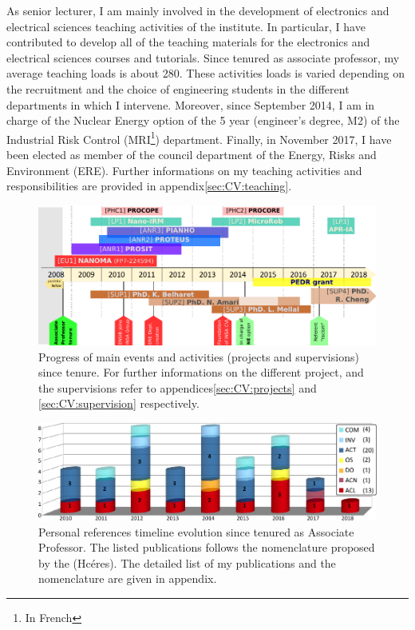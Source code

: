 \smallskip

As senior lecturer, I am mainly involved in the development of electronics and electrical sciences teaching activities of the institute.
In particular, I have contributed to develop all of the teaching materials for the electronics and electrical sciences  courses and tutorials.
Since tenured as associate professor, my average teaching loads is about \SI{280}{\hETD}.
These activities loads is varied depending on the recruitment and the choice of engineering students in the different departments in which I intervene. 
%
Moreover, since September 2014, I am in charge of the Nuclear Energy option of the 5 year (engineer's degree, M2) of the Industrial Risk Control (MRI\footnote{In French }) department. 
Finally, in November 2017, I have been elected as member of the council department of the Energy, Risks and Environment (ERE).
Further informations on my teaching activities and responsibilities are provided in appendix\;\ref{sec:CV:teaching}.



\SkipAndBreak[1]

%
\begin{figure}[tb]
  \centering
  \includegraphics{fig/chapI/dfolio_timeline} %
  \caption[Progress of main events and activities.]{Progress of main events and activities (\eg projects and supervisions) since  tenure. 
    For further informations on the different project, and the \PhD supervisions refer to appendices\;\ref{sec:CV:projects} and \ref{sec:CV:supervision} respectively.}\label{fig:timeline}
\end{figure}
%
\begin{figure}[tb]
  \centering
  \includegraphics{fig/chapI/dfolio_publisAll} %
  \caption[Personal references timeline since tenured as Associate Professor.]{Personal references timeline evolution since tenured as Associate Professor.
    The listed publications follows the nomenclature proposed by the { (Hcéres)}\cite{2018_hceres}.
    The detailed list of my publications and the nomenclature are given in appendix\;\RefAnnexeRef. }
  \label{fig:publis}
\end{figure}

